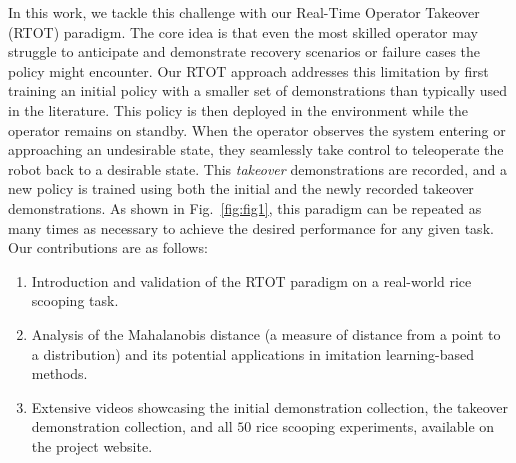 In this work, we tackle this challenge with our Real-Time Operator Takeover (RTOT) paradigm. The core idea is that even the most skilled operator may struggle to anticipate and demonstrate recovery scenarios or failure cases the policy might encounter. Our RTOT approach addresses this limitation by first training an initial policy with a smaller set of demonstrations than typically used in the literature. This policy is then deployed in the environment while the operator remains on standby. When the operator observes the system entering or approaching an undesirable state, they seamlessly take control to teleoperate the robot back to a desirable state. This \textit{takeover} demonstrations are recorded, and a new policy is trained using both the initial and the newly recorded takeover demonstrations. As shown in Fig.~\ref{fig:fig1}, this paradigm can be repeated as many times as necessary to achieve the desired performance for any given task. Our contributions are as follows: \begin{enumerate} \item Introduction and validation of the RTOT paradigm on a real-world rice scooping task. \item Analysis of the Mahalanobis distance (a measure of distance from a point to a distribution) and its potential applications in imitation learning-based methods. \item Extensive videos showcasing the initial demonstration collection, the takeover demonstration collection, and all $50$ rice scooping experiments, available on the project website. \end{enumerate}